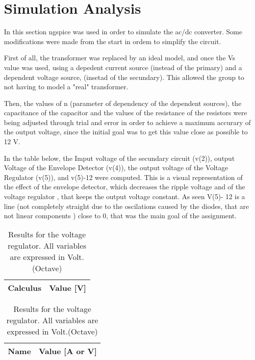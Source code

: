\section{Simulation Analysis}\label{section:sim}
 In this section ngspice was used in order to simulate the ac/dc converter. Some modifications were made from the start in ordem to simplify the circuit.
 
 First of all, the transformer was replaced by an ideal model, and once the Vs value was used, using a depedent current source (instead of the primary) and a dependent voltage source, (insetad of the secundary). This allowed the group to not having to model a "real" transformer. 
 
Then, the values of n (parameter of dependency of the dependent sources), the capacitance of the capacitor and the values of the resistance of the resistors were being adjusted through trial and error in order to achieve a maximum accurary of the output voltage, since the initial goal was to get this value close as possible to 12 V.


In the table below, the Imput voltage of the secundary circuit (v(2)), output Voltage of the Envelope Detector (v(4)), the output voltage of the  Voltage Regulator (v(5)), and v(5)-12 were computed. This is a visual representation of the effect of the envelope detector, which decreases the ripple voltage and of the voltage regulator , that keeps the output voltage constant. As seen V(5)- 12 is a line (not completely straight due to the oscilations caused by the diodes, that are not linear components ) close to 0, that was the main goal of the assignment.



\begin{table}[ht]
\parbox{.45\linewidth}{
  \centering
  \begin{tabular}{|l|r|}
    \hline    
    {\bf Calculus} & {\bf Value [V]} \\ \hline
    
  \end{tabular}
  \caption{Results for the voltage regulator. All variables are expressed in Volt. (Ngspice)}} 
\parbox{.45\linewidth}{
  \centering
  \begin{tabular}{|l|r|}
    \hline    
    {\bf Name} & {\bf Value [A or V]} \\ \hline
    
  \end{tabular}
  \caption{Results for the voltage regulator. All variables are expressed in Volt.(Octave)}}
\end{table}




